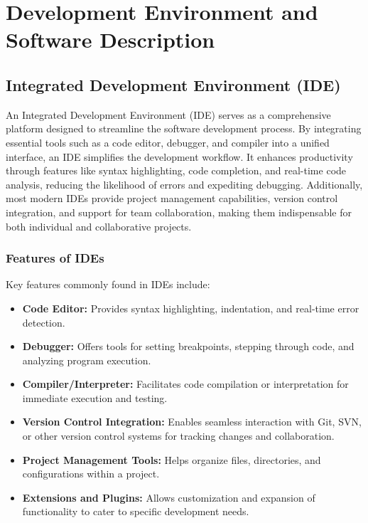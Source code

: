 %
%

\chapter{Development Environment and Software Description}

\section{Integrated Development Environment (IDE)}

An Integrated Development Environment (IDE) serves as a comprehensive platform designed to streamline the software development process. By integrating essential tools such as a code editor, debugger, and compiler into a unified interface, an IDE simplifies the development workflow. It enhances productivity through features like syntax highlighting, code completion, and real-time code analysis, reducing the likelihood of errors and expediting debugging. Additionally, most modern IDEs provide project management capabilities, version control integration, and support for team collaboration, making them indispensable for both individual and collaborative projects.

\subsection{Features of IDEs}

Key features commonly found in IDEs include:
\begin{itemize}
	\item \textbf{Code Editor:} Provides syntax highlighting, indentation, and real-time error detection.
	\item \textbf{Debugger:} Offers tools for setting breakpoints, stepping through code, and analyzing program execution.
	\item \textbf{Compiler/Interpreter:} Facilitates code compilation or interpretation for immediate execution and testing.
	\item \textbf{Version Control Integration:} Enables seamless interaction with Git, SVN, or other version control systems for tracking changes and collaboration.
	\item \textbf{Project Management Tools:} Helps organize files, directories, and configurations within a project.
	\item \textbf{Extensions and Plugins:} Allows customization and expansion of functionality to cater to specific development needs.
\end{itemize}

